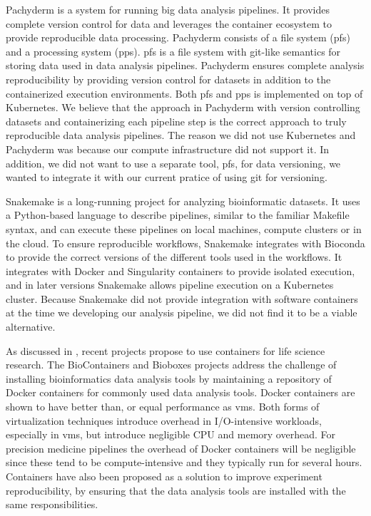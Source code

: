 Pachyderm is a system for running  big data analysis pipelines. It provides
complete version control for data and leverages the container ecosystem to
provide reproducible data processing.\cite{pachyderm} Pachyderm
consists of a file system (\gls{pfs}) and a processing system (\gls{pps}).
\gls{pfs} is a file system with git-like semantics for storing data used
in data analysis pipelines. Pachyderm ensures complete analysis reproducibility
by providing version control for datasets in addition to the containerized
execution environments. Both \gls{pfs} and \gls{pps} is implemented on top
of Kubernetes.\cite{kubernetes} We believe that the approach in
Pachyderm with version controlling datasets and containerizing each pipeline
step is the correct approach to truly reproducible data analysis pipelines. 
The reason we did not use Kubernetes and Pachyderm was because our compute
infrastructure did not support it. In addition, we did not want to use a separate
tool, \gls{pfs}, for data versioning, we wanted to integrate it with our current
pratice of using git for versioning. 

Snakemake is a long-running project for analyzing bioinformatic
datasets.\cite{koster2012snakemake} It uses a Python-based language to describe
pipelines, similar to the familiar Makefile syntax, and can execute these
pipelines on local machines, compute clusters or in the cloud. To ensure
reproducible workflows, Snakemake integrates with Bioconda to provide the
correct versions of the different tools used in the workflows. It integrates
with Docker and Singularity containers\cite{singularity} to provide isolated
execution, and in later versions Snakemake allows pipeline execution on a
Kubernetes cluster. Because Snakemake did not provide integration with software
containers at the time we developing our analysis pipeline, we did not find it
to be a viable alternative. 

As discussed in \cite{NIK, fjukstad2017review}, recent projects propose to use
containers for life science research. The BioContainers and
Bioboxes\cite{belmann2015bioboxes} projects address the challenge of installing
bioinformatics data analysis tools by maintaining a repository of Docker
containers for commonly used data analysis tools. Docker containers are shown to
have better than, or equal performance as \glspl{vm}.\cite{di2015impact} Both
forms of virtualization techniques introduce overhead in I/O-intensive
workloads, especially in \glspl{vm}, but introduce negligible CPU and memory
overhead. For precision medicine pipelines the overhead of Docker containers
will be negligible since these tend to be compute-intensive and they typically
run for several hours.\cite{di2015impact} Containers have also been proposed as
a solution to improve experiment reproducibility, by ensuring that the data
analysis tools are installed with the same
responsibilities.\cite{boettiger2015introduction} 

